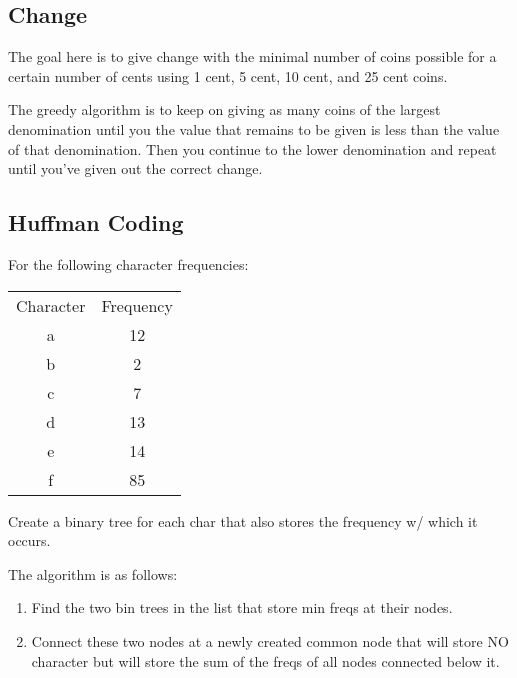 \subsection*{Change}
The goal here is to give change with the minimal number of coins possible for a
certain number of cents using 1 cent, 5 cent, 10 cent, and 25 cent coins.

The greedy algorithm is to keep on giving as many coins of the
largest denomination until you the value that remains to be
given is less than the value of that denomination. Then you
continue to the lower denomination and repeat until you've
given out the correct change.
\subsection*{Huffman Coding}
For the following character frequencies:

\begin{tabular}{cc}
    Character & Frequency \\
    a & 12\\
    b & 2\\
    c & 7\\
    d & 13\\
    e & 14\\
    f & 85
\end{tabular}

Create a binary tree for each char that also stores the frequency w/ which it occurs.

\columnbreak[0]
The algorithm is as follows:
\begin{enumerate}
    \item Find the two bin trees in the list that store min freqs at their nodes.
    \item Connect these two nodes at a newly created common node that will store NO
        character but will store the sum of the freqs of all nodes connected below it.
\end{enumerate}


